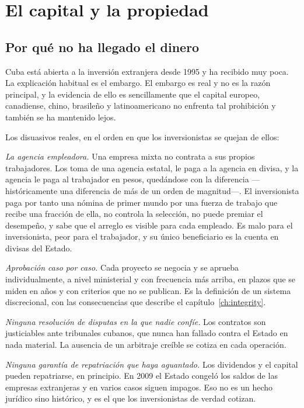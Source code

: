 \chapter{El capital y la propiedad}
\label{ch:capital}

\section{Por qué no ha llegado el dinero}

Cuba está abierta a la inversión extranjera desde 1995 y ha recibido muy poca. La explicación
habitual es el embargo. El embargo es real y no es la razón principal, y la evidencia de ello
es sencillamente que el capital europeo, canadiense, chino, brasileño y latinoamericano no
enfrenta tal prohibición y también se ha mantenido lejos.

Los disuasivos reales, en el orden en que los inversionistas se quejan de ellos:

\emph{La agencia empleadora.} Una empresa mixta no contrata a sus propios trabajadores. Los
toma de una agencia estatal, le paga a la agencia en divisa, y la agencia le paga al trabajador
en pesos, quedándose con la diferencia ---históricamente una diferencia de más de un orden de
magnitud---. El inversionista paga por tanto una nómina de primer mundo por una fuerza de
trabajo que recibe una fracción de ella, no controla la selección, no puede premiar el
desempeño, y sabe que el arreglo es visible para cada empleado. Es malo para el inversionista,
peor para el trabajador, y su único beneficiario es la cuenta en divisas del Estado.

\emph{Aprobación caso por caso.} Cada proyecto se negocia y se aprueba individualmente, a nivel
ministerial y con frecuencia más arriba, en plazos que se miden en años y con criterios que no
se publican. Es la definición de un sistema discrecional, con las consecuencias que describe el
capítulo~\ref{ch:integrity}.

\emph{Ninguna resolución de disputas en la que nadie confíe.} Los contratos son justiciables
ante tribunales cubanos, que nunca han fallado contra el Estado en nada material. La ausencia de
un arbitraje creíble se cotiza en cada operación.

\emph{Ninguna garantía de repatriación que haya aguantado.} Los dividendos y el capital pueden
repatriarse, en principio. En 2009 el Estado congeló los saldos de las empresas extranjeras y en
varios casos siguen impagos. Eso no es un hecho jurídico sino histórico, y es el que los
inversionistas de verdad cotizan.

